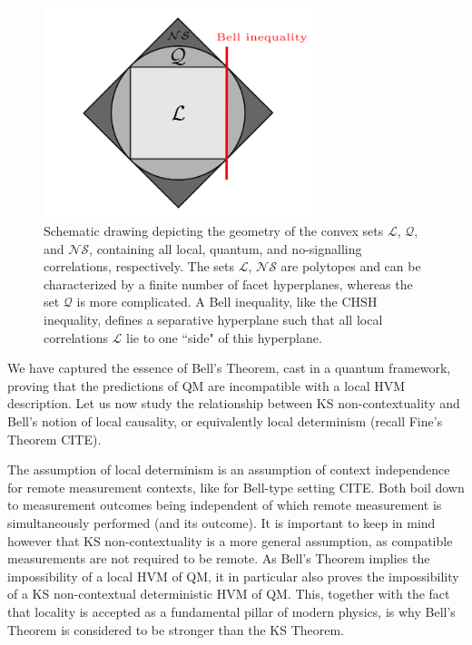 \begin{figure}
    \centering
    \includegraphics[width=0.7\textwidth]{images/correlations.png}
    \caption{Schematic drawing depicting the geometry of the convex sets $\mathcal{L}$, $\mathcal{Q}$, and $\mathcal{NS}$, containing all local, quantum, and no-signalling correlations, respectively. The sets $\mathcal{L}$, $\mathcal{NS}$ are polytopes and can be characterized by a finite number of facet hyperplanes, whereas the set $\mathcal{Q}$ is more complicated. A Bell inequality, like the CHSH inequality, defines a separative hyperplane such that all local correlations $\mathcal{L}$ lie to one ``side" of this hyperplane.}
    \label{fig:correlations}
\end{figure}

We have captured the essence of Bell's Theorem, cast in a quantum framework, proving that the predictions of QM are incompatible with a local HVM description. Let us now study the relationship between KS non-contextuality and Bell's notion of local causality, or equivalently local determinism (recall Fine's Theorem CITE). 

The assumption of local determinism is an assumption of context independence for remote measurement contexts, like for Bell-type setting CITE. Both boil down to measurement outcomes being independent of which remote measurement is simultaneously performed (and its outcome). It is important to keep in mind however that KS non-contextuality is a more general assumption, as compatible measurements are not required to be remote.
As Bell's Theorem implies the impossibility of a local HVM of QM, it in particular also proves the impossibility of a KS non-contextual deterministic HVM of QM. This, together with the fact that locality is accepted as a fundamental pillar of modern physics, is why Bell's Theorem is considered to be stronger than the KS Theorem. 

